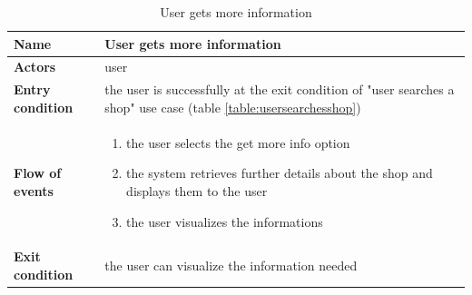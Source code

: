 \begin{table}[h!]
    \centering
    \begin{tabular}{@{}P{0.2\textwidth}P{0.70\textwidth}@{}}
        \toprule
        \textbf{Name}                 & User gets more information\\
        \midrule
        \textbf{Actors}               & user\\
        \textbf{Entry condition}      & the user is successfully at the exit condition of "user searches a shop" use case (table \ref{table:usersearchesshop})\\
        \textbf{Flow of events}       & 
        \begin{enumerate}[nolistsep, leftmargin=*]
            \item the user selects the get more info option
            \item the system retrieves further details about the shop and displays them to the user
            \item the user visualizes the informations
        \end{enumerate} \\
        \textbf{Exit condition}       & the user can visualize the information needed\\
        \bottomrule
    \end{tabular}
\caption{User gets more information}
\label{table:usergetmoreinformation}
\end{table}

